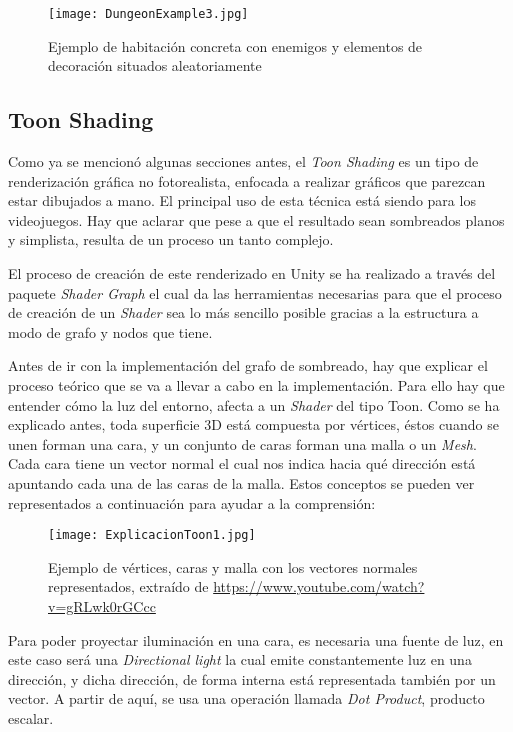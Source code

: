 \begin{figure}[H]
    \centering
    \texttt{[image: DungeonExample3.jpg]}
    \caption{Ejemplo de habitación concreta con enemigos y elementos de decoración situados aleatoriamente}
\end{figure}

\subsection{Toon Shading}

Como ya se mencionó algunas secciones antes, el \textit{Toon Shading} es un tipo de renderización gráfica no fotorealista, enfocada a realizar gráficos que parezcan estar dibujados a mano. El principal uso de esta técnica está siendo para los videojuegos. Hay que aclarar que pese a que el resultado sean sombreados planos y simplista, resulta de un proceso un tanto complejo.

El proceso de creación de este renderizado en Unity se ha realizado a través del paquete \textit{Shader Graph} el cual da las herramientas necesarias para que el proceso de creación de un \textit{Shader} sea lo más sencillo posible gracias a la estructura a modo de grafo y nodos que tiene.

Antes de ir con la implementación del grafo de sombreado, hay que explicar el proceso teórico que se va a llevar a cabo en la implementación. Para ello hay que entender cómo la luz del entorno, afecta a un \textit{Shader} del tipo Toon. Como se ha explicado antes, toda superficie 3D está compuesta por vértices, éstos cuando se unen forman una cara, y un conjunto de caras forman una malla o un \textit{Mesh}. Cada cara tiene un vector normal el cual nos indica hacia qué dirección está apuntando cada una de las caras de la malla. Estos conceptos se pueden ver representados a continuación para ayudar a la comprensión: 

\begin{figure}[H]
    \centering
    \texttt{[image: ExplicacionToon1.jpg]}
    \caption{Ejemplo de vértices, caras y malla con los vectores normales representados, extraído de \url{https://www.youtube.com/watch?v=gRLwk0rGCcc}}
\end{figure}

Para poder proyectar iluminación en una cara, es necesaria una fuente de luz, en este caso será una \textit{Directional light} la cual emite constantemente luz en una dirección, y dicha dirección, de forma interna está representada también por un vector. A partir de aquí, se usa una operación llamada \textit{Dot Product}, producto escalar.

